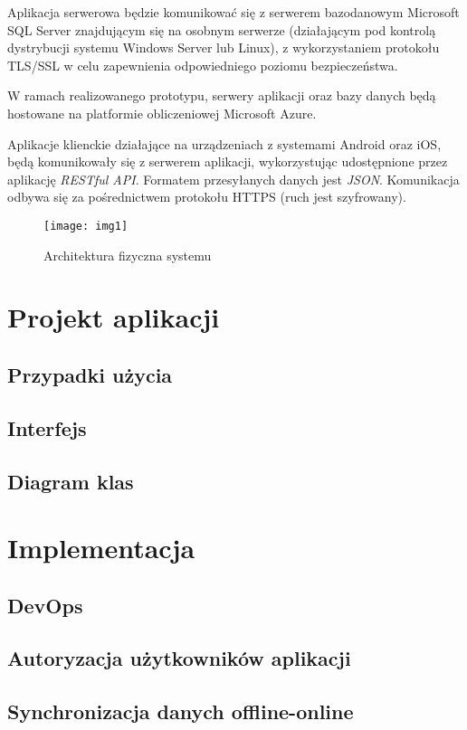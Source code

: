 \par Aplikacja serwerowa będzie komunikować się z serwerem bazodanowym Microsoft SQL Server znajdującym się na osobnym serwerze (działającym pod kontrolą dystrybucji systemu Windows Server lub Linux), z wykorzystaniem protokołu TLS/SSL w celu zapewnienia odpowiedniego poziomu bezpieczeństwa.

\par W ramach realizowanego prototypu, serwery aplikacji oraz bazy danych będą hostowane na platformie obliczeniowej Microsoft Azure. 

\par Aplikacje klienckie działające na urządzeniach z systemami Android oraz iOS, będą komunikowały się z serwerem aplikacji, wykorzystując udostępnione przez aplikację \textit{RESTful API}. Formatem przesyłanych danych jest \textit{JSON}. Komunikacja odbywa się za pośrednictwem protokołu HTTPS (ruch jest szyfrowany).
\begin{figure}[h]
\centering
\texttt{[image: img1]}
\caption{Architektura fizyczna systemu}
\end{figure}
\chapter{Projekt aplikacji}
\section{Przypadki użycia}
\section{Interfejs}
\section{Diagram klas}
\chapter{Implementacja}
\section{DevOps}
\section{Autoryzacja użytkowników aplikacji}
\section{Synchronizacja danych offline-online}
